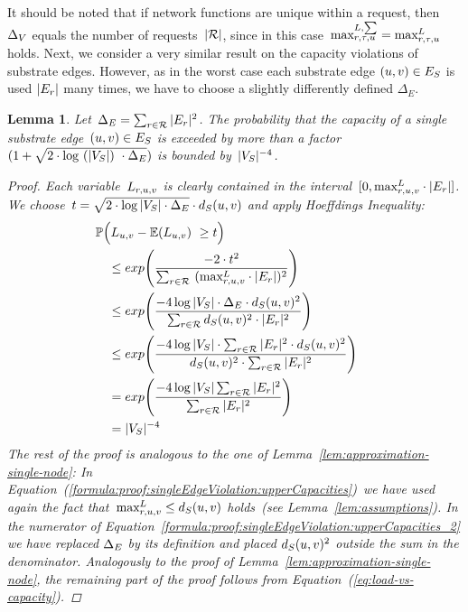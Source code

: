 \documentclass[10pt, conference, letterpaper]{IEEEtran}
\newtheorem{lemma}[theorem]{Lemma}
\begin{document}
It should be noted that if network functions are unique within a request, then~$\Delta_V$ equals the number of requests~$|\mathcal{R}|$, since in this case~$\maxLoadVSum = \maxLoadV$ holds. Next, we consider a very similar result on the capacity violations of substrate edges. However, as in the worst case each substrate edge $(u,v) \in  E_S$ is used $|E_{r}|$ many times, we have to choose a slightly differently defined $\Delta_E$.

\begin{lemma}
\label{lem:approximation-single-edge}
Let~$\Delta_E = \sum_{r \in \mathcal{R}} |E_{r}|^2$. The probability that the capacity of a single substrate edge~$(u,v) \in  E_S$ is exceeded by more than a factor~$(1+\sqrt{2\cdot \log~(|V_S|)~\cdot \Delta_E})$ is bounded by~$|V_S|^{-4}$.
\begin{proof}
Each variable~$\randVarLEdge$ is clearly contained in the interval~$[0, \maxLoadE \cdot |\VE|]$. We choose~$t = \sqrt{2\cdot \log |V_S| \cdot \Delta_E  } \cdot d_{S}(u,v)$ and apply Hoeffdings Inequality:
{
\begin{alignat}{2}
& \mathbb{P} \Big(L_{u,v} - \mathbb{E}(L_{u,v})~\geq t \Big)~&&  \notag \\
& ~~~ \leq exp \Bigg(\frac{-2\cdot t^2}{\sum_{\req \in \requests}~(\maxLoadE \cdot |\VE|)^2} \Bigg)~&& \\
& ~~~ \leq exp \Bigg(\frac{-4 \log |\SV| \cdot \DeltaE \cdot  \Scap(u,v)^2}{\sum_{\req \in \requests} \Scap(u,v)^2\cdot|\VE|^2} \Bigg)~&& \label{formula:proof:singleEdgeViolation:upperCapacities}\\
& ~~~ \leq exp \Bigg(\frac{-4 \log |\SV| \cdot \sum_{\req \in \requests} |\VE|^2 \cdot  \Scap(u,v)^2}{\Scap(u,v)^2 \cdot \sum_{\req \in \requests} |\VE|^2} \Bigg)~&& \label{formula:proof:singleEdgeViolation:upperCapacities_2}\\
& ~~~ = exp \Bigg(\frac{-4 \log |\SV| \sum_{\req \in \requests} |\VE|^2 }{\sum_{\req \in \requests} |\VE|^2} \Bigg)~&& \\
& ~~~ = |\SV|^{-4} && 
\end{alignat}
}
The rest of the proof is analogous to the one of Lemma~\ref{lem:approximation-single-node}:
In Equation~(\ref{formula:proof:singleEdgeViolation:upperCapacities})~we have used again the fact that~$\maxLoadE \leq \Scap(u,v)$ holds~(see Lemma~\ref{lem:assumptions}). In the numerator of Equation~\ref{formula:proof:singleEdgeViolation:upperCapacities_2} we have replaced $\Delta_E$ by its definition and placed $d_{S}(u,v)^2$ outside the sum in the denominator. Analogously to the proof of Lemma~\ref{lem:approximation-single-node}, the remaining part of the proof follows from Equation~(\ref{eq:load-vs-capacity}).
\end{proof}

\end{lemma}
\end{document}
